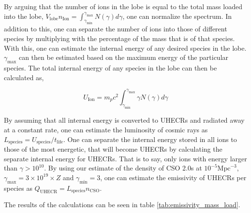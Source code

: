 By arguing that the number of ions in the lobe is equal to the total mass loaded into the lobe, $V_{\text{lobe}} n_{\text{Ion}} = \int_{\gamma_{\text{min}}}^{\gamma_{\text{max}}} N(\gamma) d\gamma$, one can normalize the spectrum. In addition to this, one can separate the number of ions into those of different species by multiplying with the percentage of the mass that is of that species. With this, one can estimate the internal energy of any desired species in the lobe. $\gamma_{\text{max}}$ can then be estimated based on the maximum energy of the particular species. The total internal energy of any species in the lobe can then be calculated as,

\begin{equation}
    U_{\text{Ion}} = m_p c^2 \int_{\gamma_{\text{min}}}^{\gamma_{\text{max}}} \gamma N(\gamma)d\gamma
\end{equation}

By assuming that all internal energy is converted to UHECRs and radiated away at a constant rate, one can estimate the luminosity of cosmic rays as $L_{\text{species}} = U_{\text{species}}/t_{\text{life}}$. One can separate the internal energy stored in all ions to those of the most energetic, that will become UHECRs by calculating the separate internal energy for UHECRs. That is to say, only ions with energy larger than $\gamma > 10^{10}$. By using our estimate of the density of CSO 2.0s at $10^{-5} \text{Mpc}^{-3}$, $\gamma_{\text{max}} = 3 \times 10^{19} \times Z$ and $\gamma_{\text{min}} = 3$, one can estimate the emissivity of UHECRs per species as $Q_{\text{UHECR}} = L_{\text{species}} n_{\text{CSO}}$.

The results of the calculations can be seen in table \ref{tab:emissivity_mass_load}.


